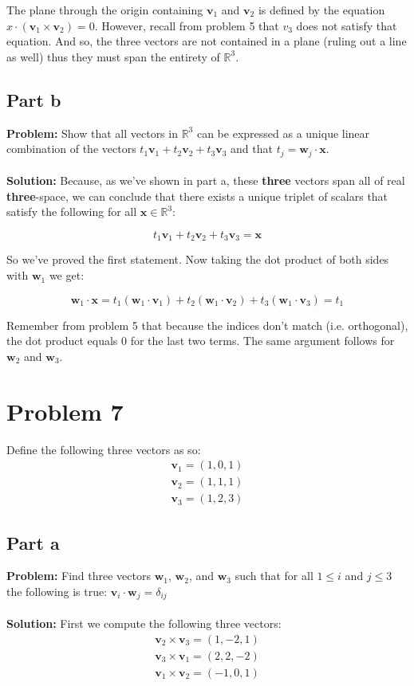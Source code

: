 \documentclass{article}
\begin{document}
The plane through the origin containing $\mathbf v_1$ and $\mathbf v_2$ is defined by the equation $x\cdot(\mathbf v_1\times\mathbf v_2)=0$. However, recall from problem 5 that $v_3$ does not satisfy that equation. And so, the three vectors are not contained in a plane (ruling out a line as well) thus they must span the entirety of $\mathbb R^3$.

\subsection{Part b}
\textbf{Problem:} Show that all vectors in $\mathbb R^3$ can be expressed as a unique linear combination of the vectors $t_1\mathbf v_1+t_2\mathbf v_2+t_3\mathbf v_3$ and that $t_j=\mathbf w_j\cdot\mathbf x$.
\\\\
\textbf{Solution:} Because, as we've shown in part a, these \textbf{three} vectors span all of real \textbf{three}-space, we can conclude that there exists a unique triplet of scalars that satisfy the following for all $\mathbf x\in\mathbb R^3$:

$$t_1\mathbf v_1+t_2\mathbf v_2+t_3\mathbf v_3=\mathbf x$$

So we've proved the first statement. Now taking the dot product of both sides with $\mathbf w_1$ we get:

$$\mathbf w_1\cdot\mathbf x=t_1(\mathbf w_1\cdot\mathbf v_1)+t_2(\mathbf w_1\cdot\mathbf v_2)+t_3(\mathbf w_1\cdot\mathbf v_3)=t_1$$

Remember from problem 5 that because the indices don't match (i.e. orthogonal), the dot product equals 0 for the last two terms. The same argument follows for $\mathbf w_2$ and $\mathbf w_3$.

\section{Problem 7}
Define the following three vectors as so:
\begin{gather*}
  \mathbf v_1=(1,0,1)\\
  \mathbf v_2=(1,1,1)\\
  \mathbf v_3=(1,2,3)
\end{gather*}

\subsection{Part a}
\textbf{Problem:} Find three vectors $\mathbf w_1$, $\mathbf w_2$, and $\mathbf w_3$ such that for all $1\le i$ and $j\le 3$ the following is true: $\mathbf v_i\cdot\mathbf w_j=\delta_{ij}$
\\\\
\textbf{Solution:} First we compute the following three vectors:
\begin{gather*}
  \mathbf v_2\times\mathbf v_3=(1,-2,1)\\
  \mathbf v_3\times\mathbf v_1=(2,2,-2)\\
  \mathbf v_1\times\mathbf v_2=(-1,0,1)
\end{gather*}
\end{document}

